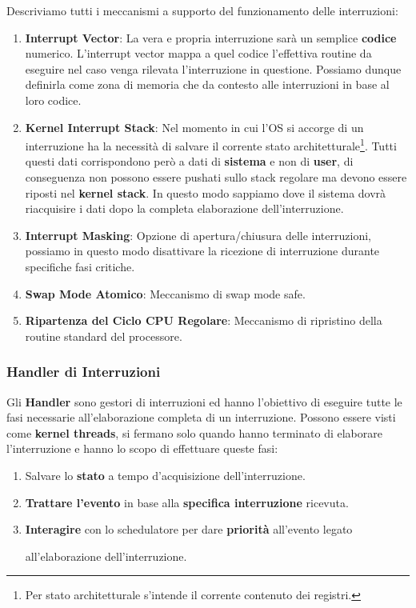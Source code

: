 \documentclass{article}
\begin{document}
Descriviamo tutti i meccanismi a supporto del funzionamento delle interruzioni:

\begin{enumerate}
    \item \textbf{Interrupt Vector}: La vera e propria interruzione sarà un semplice \textbf{codice} numerico. L'interrupt vector mappa a quel codice l'effettiva routine da eseguire nel caso venga rilevata l'interruzione in questione. Possiamo dunque definirla come zona di memoria che da contesto alle interruzioni in base al loro codice.
    \item \textbf{Kernel Interrupt Stack}: Nel momento in cui l'OS si accorge di un interruzione ha la necessità di salvare il corrente stato architetturale\footnote{Per stato architetturale s'intende il corrente contenuto dei registri.}. Tutti questi dati corrispondono però a dati di \textbf{sistema} e non di \textbf{user}, di conseguenza non possono essere pushati sullo stack regolare ma devono essere riposti nel \textbf{kernel stack}. In questo modo sappiamo dove il sistema dovrà riacquisire i dati dopo la completa elaborazione dell'interruzione.
    \item \textbf{Interrupt Masking}: Opzione di apertura/chiusura delle interruzioni, possiamo in questo modo disattivare la ricezione di interruzione durante specifiche fasi critiche.
    \item \textbf{Swap Mode Atomico}: Meccanismo di swap mode safe.
    \item \textbf{Ripartenza del Ciclo CPU Regolare}: Meccanismo di ripristino della routine standard del processore.
\end{enumerate}

\subsubsection{Handler di Interruzioni}

Gli \textbf{Handler} sono gestori di interruzioni ed hanno l'obiettivo di eseguire tutte le fasi necessarie all'elaborazione completa di un interruzione. Possono essere visti come \textbf{kernel threads}, si fermano solo quando hanno terminato di elaborare l'interruzione e hanno lo scopo di effettuare queste fasi:

\begin{enumerate}
    \item Salvare lo \textbf{stato} a tempo d'acquisizione dell'interruzione.
    \item \textbf{Trattare l'evento} in base alla \textbf{specifica interruzione} ricevuta.
    \item \textbf{Interagire} con lo schedulatore per dare \textbf{priorità} all'evento legato 
    
    all'elaborazione dell'interruzione.
\end{enumerate}
\end{document}
